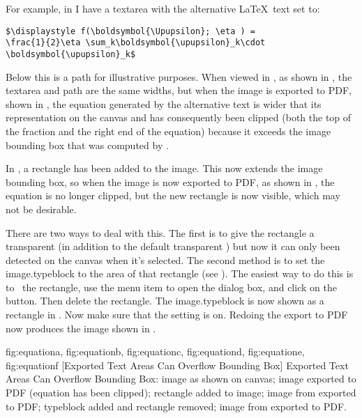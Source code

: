 For example, in  I have a \gls{textarea} with the
alternative \LaTeX\ text set to:
\begin{verbatim}
$\displaystyle f(\boldsymbol{\Upupsilon}; \eta ) = 
\frac{1}{2}\eta \sum_k\boldsymbol{\upupsilon}_k\cdot 
\boldsymbol{\upupsilon}_k$
\end{verbatim}
Below this is a \gls{path} for illustrative purposes. When viewed in
\FlowframTk, as shown in , the
\gls*{textarea} and \gls*{path} are the same widths, but when the
image is exported to PDF, shown in , the
equation generated by the alternative text is wider that its
representation on the \gls{canvas} and has consequently been clipped
(both the top of the fraction and the right end of the equation)
because it exceeds the image bounding box that was computed by
\FlowframTk.

In , a rectangle has been
added to the image. This now extends the image bounding box, so when
the image is now exported to PDF, as shown in
, the equation is no longer clipped,
but the new rectangle is now visible, which may not be desirable.

There are two ways to deal with this. The first is to give the
rectangle a transparent  (in addition to the
default transparent ) but now it can only been detected on the
\gls{canvas} when it's selected. The second method is to set the
\gls{image.typeblock} to the area of that rectangle (see ).
The easiest way to do this is to \select\ the rectangle, use the
 menu item to open the
 dialog box, and click on the
 button. Then delete the
rectangle. The \gls{image.typeblock} is now shown as a  rectangle in
. Now make sure that the
setting is on. Redoing the export to PDF now
produces the image shown in .

{
 {fig:equationa}{}{},
 {fig:equationb}{}{},
 {fig:equationc}{}{},
 {fig:equationd}{}{},
 {fig:equatione}{}{},
 {fig:equationf}{}{}
}
[Exported Text Areas Can Overflow Bounding Box]
{Exported Text Areas Can Overflow Bounding Box:
 image as shown on canvas;
 image exported to PDF (equation has been clipped);
 rectangle added to image;
 image from  exported to PDF;
 typeblock added and rectangle removed;
 image from  exported to PDF.}

